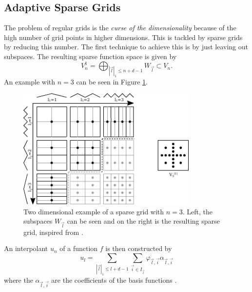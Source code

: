 \subsection{Adaptive Sparse Grids}
The problem of regular grids is the \textit{curse of the dimensionality} because of the high number of grid points in higher dimensions. This is tackled by sparse grids \cite{zenger1991sparse, bungartz2004sparse} by reducing this number. The first technique to achieve this is by just leaving out subspaces. The resulting sparse function space is given by 
\begin{equation}
	V_{n}^1 = \bigoplus_{\left|\vec{l}\right|_1 \le n+d-1 } W_{\vec{l}} \subset V_n.
\end{equation}
An example with $ n = 3 $ can be seen in Figure \ref{fig:sparse_grid}.
\begin{figure}[H]
	\centering
	\includegraphics[width=0.8\textwidth]{figures/Fig_2_9_two_dim_example}
	\caption{ Two dimensional example of a sparse grid with $ n = 3 $. Left, the subspaces $ W_{\vec{l}} $ can be seen and on the right is the resulting sparse grid, inspired from \cite{pfluger2010spatially}. }
	\label{fig:sparse_grid}
\end{figure}

An interpolant $ u_n $ of a function $ f $ is then constructed by
\begin{equation}
	u_l = \sum_{ \left|\vec{l}\right|_1 \le l+d-1 } \sum_{ \vec{i} \in I_{\vec{l}} } \varphi_{\vec{l}, \vec{i}} \alpha_{\vec{l},\vec{i}}
\end{equation}
where the $ \alpha_{\vec{l},\vec{i}} $ are the coefficients of the basis functions \cite{obersteiner2022spatially}.

